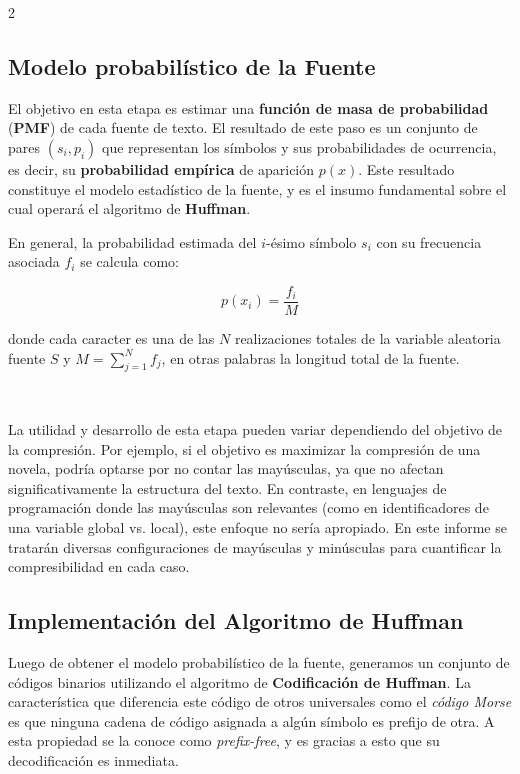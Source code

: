 \documentclass[a4paper, 10pt]{article}
\begin{document}
\begin{multicols}{2}
    \subsection{Modelo probabilístico de la Fuente}


        El objetivo en esta etapa es estimar una \textbf{función de masa de probabilidad} (\textbf{PMF}) de cada fuente de texto. El resultado de este paso es un conjunto de pares \( (s_i, p_i) \) que representan los símbolos y sus probabilidades de ocurrencia, es decir, su \textbf{probabilidad empírica} de aparición \( p(x) \). Este resultado constituye el modelo estadístico de la fuente, y es el insumo fundamental sobre el cual operará el algoritmo de \textbf{Huffman}. 

        En general, la probabilidad estimada del $i$-ésimo símbolo \( s_i \) con su frecuencia asociada $f_i$ se calcula como:

        \begin{equation}
            p(x_i) = \frac{f_i}{M}
            \label{eq:prob}
        \end{equation}

        donde cada caracter es una de las $N$ realizaciones totales de la variable aleatoria fuente \( S \) y $M=\sum_{j=1}^{N} f_j$, en otras palabras la longitud total de la fuente.

        \
        
        La utilidad y desarrollo de esta etapa pueden variar dependiendo del objetivo de la compresión. Por ejemplo, si el objetivo es maximizar la compresión de una novela, podría optarse por no contar las mayúsculas, ya que no afectan significativamente la estructura del texto. En contraste, en lenguajes de programación donde las mayúsculas son relevantes (como en identificadores de una variable global vs. local), este enfoque no sería apropiado. En este informe se tratarán diversas configuraciones de mayúsculas y minúsculas para cuantificar la compresibilidad en cada caso. 

    \subsection{Implementación del Algoritmo de Huffman}

    Luego de obtener el modelo probabilístico de la fuente, generamos un conjunto de códigos binarios utilizando el algoritmo de \textbf{Codificación de Huffman}. La característica que diferencia este código de otros universales como el \textit{código Morse} es que ninguna cadena de código asignada a algún símbolo es prefijo de otra. A esta propiedad se la conoce como \textit{prefix-free}, y es gracias a esto que su decodificación es inmediata.


\end{multicols}
\end{document}
